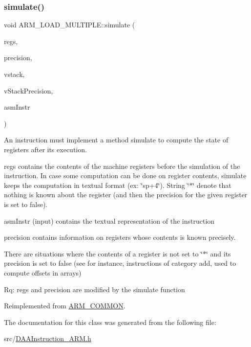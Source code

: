 \subsubsection{\texorpdfstring{simulate()}{simulate()}}
{\footnotesize\ttfamily void A\+R\+M\+\_\+\+L\+O\+A\+D\+\_\+\+M\+U\+L\+T\+I\+P\+L\+E\+::simulate (\begin{DoxyParamCaption}\item[{\hyperlink{DAAInstruction_8h_af0fae93a861de9cf37988d5673cac523}{reg\+Table} \&}]{regs,  }\item[{\hyperlink{DAAInstruction_8h_a0e8cae02815a5f8adc750122d790b455}{reg\+Precision\+Table} \&}]{precision,  }\item[{\hyperlink{DAAInstruction_8h_a1b0e70ac1a04f06c8132055ed01f589f}{stack\+Type} \&}]{vstack,  }\item[{\hyperlink{DAAInstruction_8h_ac5cb793e9dac3fa9693da78b7e29ab30}{stack\+Prec\+Type} \&}]{v\+Stack\+Precision,  }\item[{const string \&}]{asm\+Instr }\end{DoxyParamCaption})\hspace{0.3cm}{\ttfamily [virtual]}}

An instruction must implement a method simulate to compute the state of registers after its execution.

regs contains the contents of the machine registers before the simulation of the instruction. In case some computation can be done on register contents, simulate keeps the computation in textual format (ex\+: \char`\"{}sp+4\char`\"{}). String \char`\"{}$\ast$\char`\"{} denote that nothing is known about the register (and then the precision for the given register is set to false).

asm\+Instr (input) contains the textual representation of the instruction

precision contains information on registers whose contents is known precisely.

There are situations where the contents of a register is not set to \char`\"{}$\ast$\char`\"{} and its precision is set to false (see for instance, instructions of category add, used to compute offsets in arrays)

Rq\+: regs and precision are modified by the simulate function 

Reimplemented from \hyperlink{classARM__COMMON_a89eb552311ce787557a976aee2fa2db6}{A\+R\+M\+\_\+\+C\+O\+M\+M\+ON}.



The documentation for this class was generated from the following file\+:\begin{DoxyCompactItemize}
\item 
src/\hyperlink{DAAInstruction__ARM_8h}{D\+A\+A\+Instruction\+\_\+\+A\+R\+M.\+h}\end{DoxyCompactItemize}
